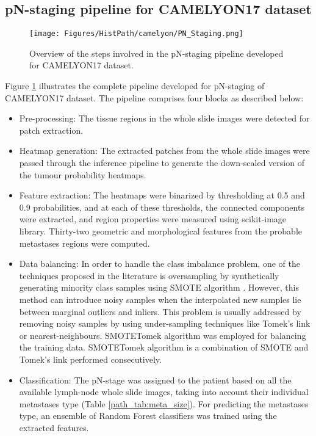 \documentclass[times,twocolumn,final,authoryear]{tmp}
\begin{document}
\subsection{pN-staging pipeline for CAMELYON17 dataset}
\label{path_sec:path_pnstaging}

\begin{figure}[!h]
    \centering
    \texttt{[image: Figures/HistPath/camelyon/PN\_Staging.png]}
    \caption{Overview of the steps involved in the pN-staging pipeline developed for CAMELYON17 dataset.}
    \label{path_fig:pn-pipeline}
\end{figure}

Figure \ref{path_fig:pn-pipeline} illustrates the complete pipeline developed for pN-staging of CAMELYON17 dataset. The pipeline comprises four blocks as described below:
\begin{itemize}
    \item Pre-processing: The tissue regions in the whole slide images were detected for patch extraction.
    \item Heatmap generation: The extracted patches from the whole slide images were passed through the inference pipeline to generate the down-scaled version of the tumour probability heatmaps.
    \item Feature extraction: The heatmaps were binarized by thresholding at 0.5 and 0.9 probabilities, and at each of these thresholds, the connected components were extracted, and region properties were measured using scikit-image \citep{scikit-image} library. Thirty-two geometric and morphological features from the probable metastases regions were computed.
  


    \item Data balancing: In order to handle the class imbalance problem, one of the techniques proposed in the literature is oversampling by synthetically generating minority class samples using SMOTE algorithm \citep{chawla2002smote}. However, this method can introduce noisy samples when the interpolated new samples lie between marginal outliers and inliers. This problem is usually addressed by removing noisy samples by using under-sampling techniques like Tomek's link \citep{tomek1976two} or nearest-neighbours. SMOTETomek \citep{batista2004study} algorithm was employed for balancing the training data. SMOTETomek algorithm is a combination of SMOTE and Tomek's link performed consecutively.    
    
    \item Classification: The pN-stage was assigned to the patient based on all the available lymph-node whole slide images, taking into account their individual metastases type (Table \ref{path_tab:meta_size}). For predicting the metastases type, an ensemble of Random Forest classifiers \citep{liaw2002classification} was trained using the extracted features.
\end{itemize}
\end{document}
